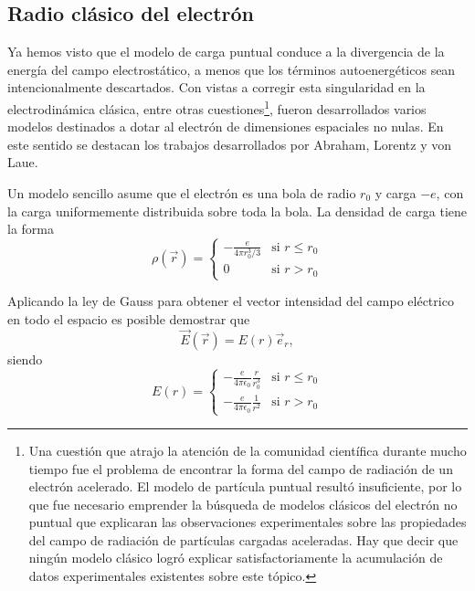 \documentclass[12pt,a4paper]{book}
\begin{document}
\subsection{Radio clásico del electrón}

Ya hemos visto que el modelo de carga puntual conduce a la divergencia de la energía del campo electrostático, a menos que los términos autoenergéticos sean intencionalmente descartados. Con vistas a corregir esta singularidad en la electrodinámica clásica, entre otras cuestiones\footnote{Una cuestión que atrajo la atención de la comunidad científica durante mucho tiempo fue el problema de encontrar la forma del campo de radiación de un electrón acelerado. El modelo de partícula puntual resultó insuficiente, por lo que fue necesario emprender la búsqueda de modelos clásicos del electrón no puntual que explicaran las observaciones experimentales sobre las propiedades del campo de radiación de partículas cargadas aceleradas. Hay que decir que ningún modelo clásico logró explicar satisfactoriamente la acumulación de datos experimentales existentes sobre este tópico.}, fueron desarrollados varios modelos destinados a dotar al electrón de dimensiones espaciales no nulas. En este sentido se destacan los trabajos desarrollados por Abraham, Lorentz y von Laue.

Un modelo sencillo asume que el electrón es una bola de radio $r_0$ y carga $-e$, con la carga uniformemente distribuida sobre toda la bola. La densidad de carga tiene la forma
\begin{equation}
\rho(\vec{r}) = 
\begin{cases}
-\frac{e}{4\pi r_0^3/3} & \text{si } r \leq r_0 \\
0 & \text{si } r > r_0
\end{cases}
\end{equation}

Aplicando la ley de Gauss para obtener el vector intensidad del campo eléctrico en todo el espacio es posible demostrar que
\begin{equation}
\vec{E}(\vec{r}) = E(r)\vec{e}_r,
\end{equation}
siendo
\begin{equation}
E(r) = 
\begin{cases}
-\frac{e}{4\pi\epsilon_0}\frac{r}{r_0^3} & \text{si } r \leq r_0 \\
-\frac{e}{4\pi\epsilon_0}\frac{1}{r^2} & \text{si } r > r_0
\end{cases}
\end{equation}
\end{document}
